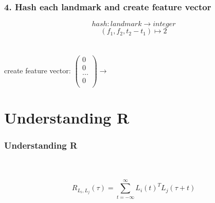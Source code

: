 \documentclass{beamer}
\begin{document}
\begin{frame}
\frametitle{4. Hash each landmark and create feature vector}
\begin{displaymath}
hash: landmark \rightarrow integer 
\end{displaymath}
\begin{displaymath}
(f_1, f_2, t_2-t_1) \mapsto 2
\end{displaymath}
\ \\
\ \\
create feature vector: $\left( \begin{array}{c}
0\\
0\\
...\\
0\\
\end{array}
\right)
\rightarrow$
\end{frame}




\section{Understanding R}

\begin{frame}
\frametitle{Understanding R}
\begin{center}
\end{center}
\ \\
\ \\
\begin{displaymath}
R_{  L_i,L_j  }(\tau)= \sum_{ t = -\infty}^{\infty}  L_i(t)^T L_j(\tau +t)
\end{displaymath}
\end{frame}
\end{document}
